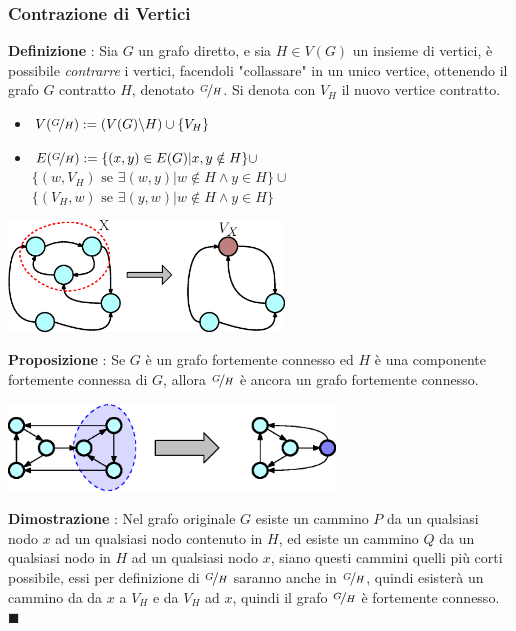 \documentclass[12pt, letterpaper]{article}
\begin{document}
\subsubsection{Contrazione di Vertici}
\textbf{Definizione} : Sia $G$ un grafo diretto, e sia $H\in V(G)$ un insieme di vertici, è possibile
\textit{contrarre} i vertici, facendoli "collassare" in un unico vertice, ottenendo il grafo $G$ contratto $H$, denotato
$\nicefrac{G}{H}$. Si denota con $V_H$ il nuovo vertice contratto.\begin{itemize}
    \item  $V(\nicefrac{G}{H}) := (V(G)\backslash H)\cup \{V_H\}$
    \item $E(\nicefrac{G}{H}) := \{(x,y)\in E(G)| x,y\notin H\}\cup$\\
          \hphantom{identaiden.}$\{(w,V_H)\text{ se } \exists(w,y)|w \notin H\land y \in H\}\cup$\\
          \hphantom{identaiden.}$\{(V_H,w)\text{ se } \exists(y,w)|w \notin H\land y \in H\}$
\end{itemize} \begin{center}
    \includegraphics[width=0.55\textwidth ]{images/contrazione.eps}
\end{center}
\textbf{Proposizione} : Se $G$ è un grafo fortemente connesso ed $H$ è una componente fortemente connessa di $G$, allora $\nicefrac{G}{H}$ è
ancora un grafo fortemente connesso.\begin{center}
    \includegraphics[width=0.65\textwidth ]{images/propFortCOnn.eps}
\end{center}
\textbf{Dimostrazione} : Nel grafo
originale $G$ esiste un cammino $P$ da un qualsiasi nodo $x$ ad un qualsiasi nodo contenuto in $H$, ed esiste un
cammino $Q$ da un qualsiasi nodo in $H$ ad un qualsiasi nodo $x$, siano questi cammini quelli più corti possibile, essi
per definizione di $\nicefrac{G}{H}$ saranno anche in $\nicefrac{G}{H}$, quindi esisterà un cammino da
da $x$ a $V_H$ e da $V_H$ ad $x$, quindi il grafo $\nicefrac{G}{H}$ è fortemente connesso. $\blacksquare$
\end{document}

